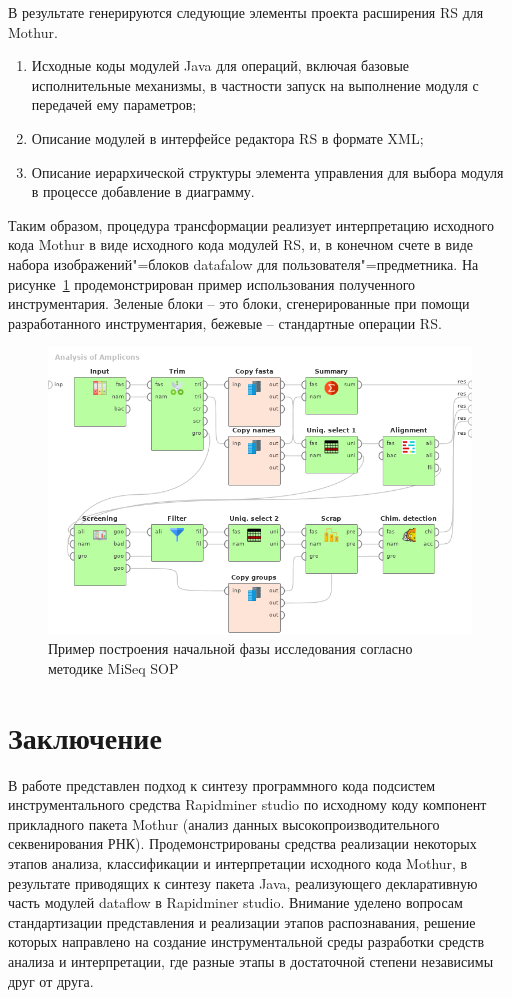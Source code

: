 \documentclass[12pt]{article}
\begin{document}
В результате генерируются следующие элементы проекта расширения RS для Mothur.
\begin{enumerate}
\item Исходные коды модулей Java для операций, включая базовые исполнительные механизмы, в частности запуск на выполнение модуля с передачей ему параметров;
\item Описание модулей в интерфейсе редактора RS в формате XML;
\item Описание иерархической структуры элемента управления для выбора модуля в процессе добавление в диаграмму.
\end{enumerate}
Таким образом, процедура трансформации реализует интерпретацию исходного кода Mothur в виде исходного кода модулей RS, и, в конечном счете в виде набора изображений"=блоков datafalow для пользователя"=предметника.  На рисунке~\ref{fig:ex} продемонстрирован пример использования полученного инструментария.  Зеленые блоки --  это блоки, сгенерированные при помощи разработанного инструментария, бежевые -- стандартные операции RS.

\begin{figure}
  \centering
   \includegraphics[width=0.8\linewidth]{Dataflow-color-en.png}
  \caption{Пример построения начальной фазы исследования согласно методике MiSeq SOP}
  \label{fig:ex}
\end{figure}

\section*{Заключение}

В работе представлен подход к синтезу программного кода подсистем
инструментального средства Rapidminer studio по исходному коду компонент
прикладного пакета Mothur (анализ данных высокопроизводительного
секвенирования РНК). Продемонстрированы средства реализации некоторых этапов
анализа, классификации и интерпретации исходного кода Mothur, в
результате приводящих к синтезу пакета Java, реализующего декларативную
часть модулей dataflow в Rapidminer studio. Внимание уделено вопросам
стандартизации представления и реализации этапов распознавания, решение
которых направлено на создание инструментальной среды разработки средств
анализа и интерпретации, где разные этапы в достаточной степени
независимы друг от друга.
\end{document}
